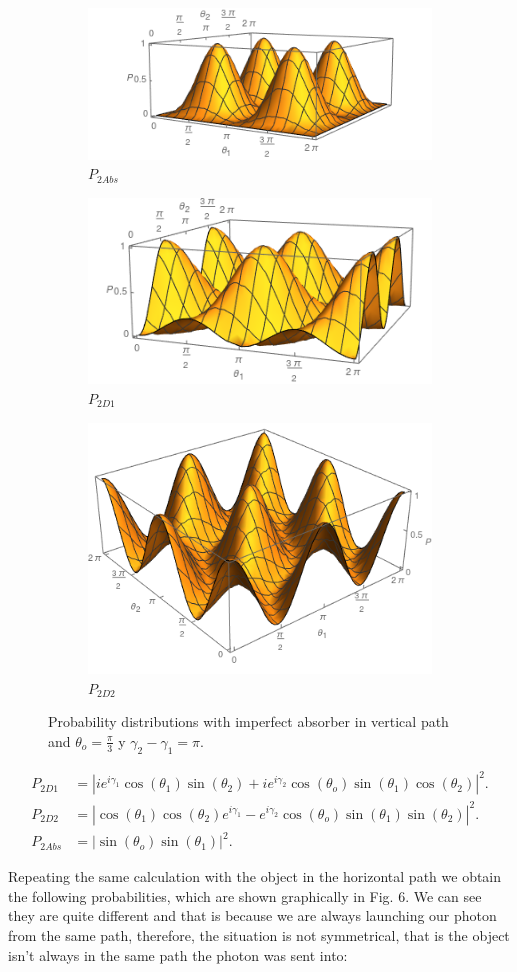 \documentclass[12pt]{article}
\begin{document}
\begin{figure}[t!]
\centering
\begin{subfigure}[b]{0.45\linewidth}
\includegraphics[width=\linewidth,height=2.8 cm]{images/P1abs.png}
\caption{$P_{2Abs}$}
\label{fig:BS2}
\end{subfigure}
\begin{subfigure}[b]{0.45\linewidth}
\includegraphics[width=\linewidth,height=2.8 cm]{images/P1d1.png}
\caption{$P_{2D1}$}
\label{fig:westminster_aerea}
\end{subfigure}
\begin{subfigure}[b]{0.45\linewidth}
\includegraphics[width=\linewidth,height=2.8 cm]{images/P1d2.png}
\caption{$P_{2D2}$}
\label{fig:BS2}
\end{subfigure}
\caption{Probability distributions with imperfect absorber in vertical path and $\theta_{o}=\frac{\pi}{3}$ y $\gamma_{2}-\gamma_{1}=\pi$.}
\label{fig:westminster}
\end{figure} 


\begin{align}
 P_{2D1}&=|ie^{i\gamma_{1}}\cos(\theta_{1})\sin(\theta_{2})+i e^{i\gamma_{2}}\cos(\theta_{o}) \sin(\theta_{1})\cos(\theta_{2})|^2.\\
 P_{2D2}&=|\cos(\theta_{1})\cos(\theta_{2})e^{i\gamma_{1}}- e^{i\gamma_{2}}\cos(\theta_{o}) \sin(\theta_{1})\sin(\theta_{2})|^2.\\
 P_{2Abs}&=|\sin(\theta_{o}) \sin(\theta_{1})|^2.
\end{align}


Repeating the same calculation with the object in the horizontal path we obtain the following probabilities, which are shown graphically in Fig. 6. We can see they are quite different and that is because we are always launching our photon from the same path, therefore, the situation is not symmetrical, that is the object isn't always in the same path the photon was sent into:
\end{document}
